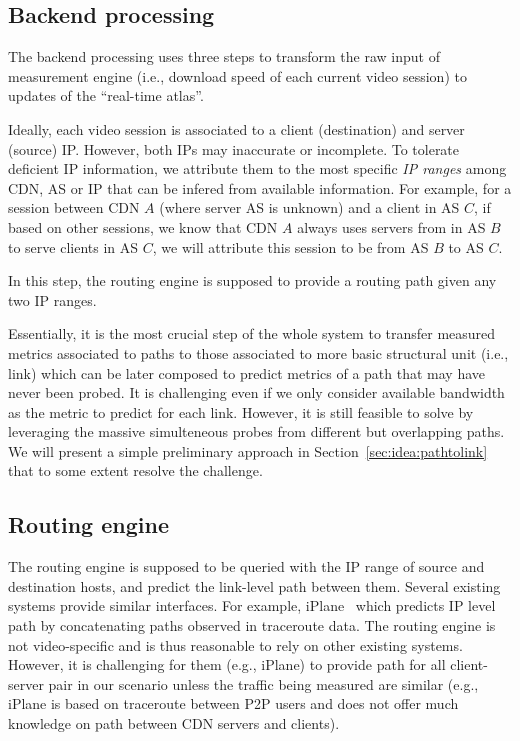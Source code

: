 \subsection{Backend processing}

The backend processing uses three steps to transform the raw input of measurement engine (i.e., download speed of each current video session) to updates of the ``real-time atlas''.

 Ideally, each video session is associated to a client (destination) and server (source) IP. However, both IPs may inaccurate or incomplete. To tolerate deficient IP information, we attribute them to the most specific {\it IP ranges} among CDN, AS or IP that can be infered from available information. For example, for a session between CDN $A$ (where server AS is unknown) and a client in AS $C$, if based on other sessions, we know that CDN $A$ always uses servers from in AS $B$ to serve clients in AS $C$, we will attribute this session to be from AS $B$ to AS $C$.

 In this step, the routing engine is supposed to provide a routing path given any two IP ranges. 

 Essentially, it is the most crucial step of the whole system to transfer measured metrics associated to paths to those associated to more basic structural unit (i.e., link) which can be later composed to predict metrics of a path that may have never been probed. It is challenging even if we only consider available bandwidth as the metric to predict for each link. However, it is still feasible to solve by leveraging the massive simulteneous probes from different but overlapping paths. We will present a simple preliminary approach in Section~\ref{sec:idea:pathtolink} that to some extent resolve the challenge.


\subsection{Routing engine}
The routing engine is supposed to be queried with the IP range of source and destination hosts, and predict the link-level path between them. 
Several existing systems provide similar interfaces. For example, iPlane~\cite{} which predicts IP level path by concatenating paths observed in traceroute data. The routing engine is not video-specific and is thus reasonable to rely on other existing systems. However, it is challenging for them (e.g., iPlane) to provide path for all client-server pair in our scenario unless the traffic being measured are similar (e.g., iPlane is based on traceroute between P2P users and does not offer much knowledge on path between CDN servers and clients).

